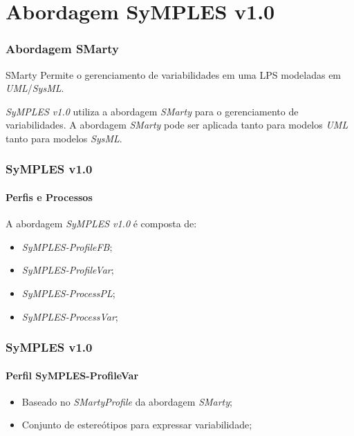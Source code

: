 \section{Abordagem SyMPLES v1.0}



\begin{frame}
\frametitle{Abordagem SMarty}

\begin{block}{SMarty}
   Permite o gerenciamento de variabilidades em uma LPS modeladas em \textit{UML}/\textit{SysML}.
\end{block}

\textit{SyMPLES v1.0} utiliza a abordagem \textit{SMarty} para o gerenciamento de variabilidades. A abordagem \textit{SMarty} pode ser aplicada tanto para modelos \textit{UML} tanto para modelos \textit{SysML}.

\end{frame}


\begin{frame}
\frametitle{SyMPLES v1.0}
\framesubtitle{Perfis e Processos}

A abordagem \textit{SyMPLES v1.0} é composta de:

\begin{itemize}
 \item {
   \textit{SyMPLES-ProfileFB};
 }
 \item {
   \textit{SyMPLES-ProfileVar};
 }
 \item {
   \textit{SyMPLES-ProcessPL};
 }
 \item {
   \textit{SyMPLES-ProcessVar};
 }
 
\end{itemize}

\end{frame}


\begin{frame}
\frametitle{SyMPLES v1.0}
\framesubtitle{Perfil SyMPLES-ProfileVar}

\begin{itemize}
 \item {
   Baseado no \textit{SMartyProfile} da abordagem \textit{SMarty};
 }
 \item {
   Conjunto de estereótipos para expressar variabilidade;
 }
\end{itemize}

\end{frame}


